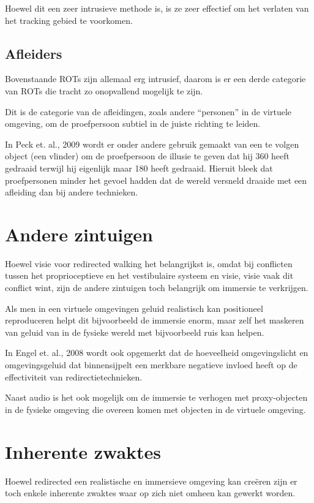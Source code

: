 Hoewel dit een zeer intrusieve methode is, is ze zeer effectief om het verlaten
van het tracking gebied te voorkomen.


\subsection{Afleiders}
Bovenstaande ROTs zijn allemaal erg intrusief, daarom is er een derde categorie
van ROTs die tracht zo onopvallend mogelijk te zijn.

Dit is de categorie van de afleidingen, zoals andere ``personen'' in de virtuele
omgeving\cite{neth12}, om de proefpersoon subtiel in de juiste richting te 
leiden.

In Peck et. al., 2009 \cite{peck09} wordt er onder andere gebruik gemaakt van een 
te volgen object (een vlinder) om de proefpersoon de illusie te geven dat hij 
\mbox{360\textdegree} heeft gedraaid terwijl hij eigenlijk maar 180\textdegree{}
heeft gedraaid. Hieruit bleek dat proefpersonen minder het gevoel hadden dat de
wereld versneld draaide met een afleiding dan bij andere technieken.


\section{Andere zintuigen}
Hoewel visie voor redirected walking het belangrijkst is, omdat bij conflicten
tussen het proprioceptieve en het vestibulaire systeem en visie, visie vaak dit
conflict wint\cite{berthoz02,dichgans78,bruder08}, zijn de andere zintuigen toch
belangrijk om immersie te verkrijgen. 

Als men in een virtuele omgevingen geluid realistisch kan positioneel
reproduceren helpt dit bijvoorbeeld de immersie enorm\cite{lackner77}, maar zelf
het maskeren van geluid van in de fysieke wereld met bijvoorbeeld ruis kan
helpen\cite{usoh99}.

In Engel et. al., 2008\cite{engel08} wordt ook opgemerkt dat de hoeveelheid 
omgevingslicht en omgevingsgeluid dat binnensijpelt een merkbare negatieve 
invloed heeft op de effectiviteit van redirectietechnieken.

Naast audio is het ook mogelijk om de immersie te verhogen met proxy-objecten in
de fysieke omgeving die overeen komen met objecten in de virtuele 
omgeving\cite{steinicke09}.


\section{Inherente zwaktes}
Hoewel redirected een realistische en immersieve omgeving kan cre\"eren zijn er
toch enkele inherente zwaktes waar op zich niet omheen kan gewerkt worden.

